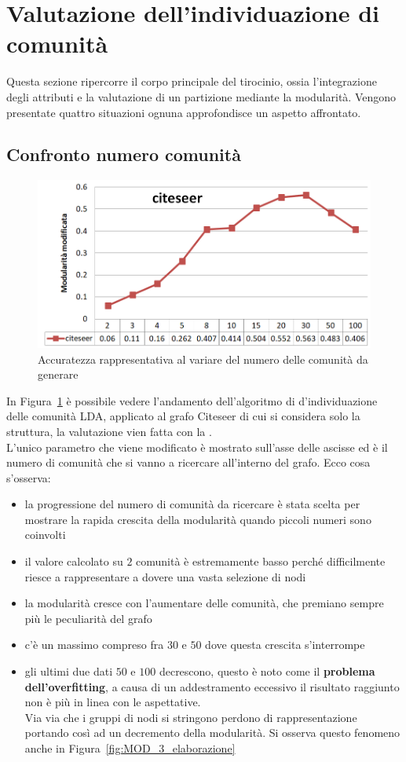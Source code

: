 \section{Valutazione dell'individuazione di comunità}
Questa sezione ripercorre il corpo principale del tirocinio, ossia l'integrazione degli attributi e la valutazione di un partizione mediante la modularità. Vengono presentate quattro situazioni ognuna approfondisce un aspetto affrontato.
%
\subsection{Confronto numero comunità}%
%
\begin{figure}[htp]
	\centering
	\includegraphics[width=\linewidth]{immagini/MOD_1_num_cmty}
	\caption{Accuratezza rappresentativa al variare del numero delle comunità da generare}
	\label{fig:MOD_1_num_cmty}
\end{figure}
%
In Figura~\ref{fig:MOD_1_num_cmty} è possibile vedere l'andamento dell'algoritmo di d'individuazione delle comunità LDA, applicato al grafo Citeseer di cui si considera solo la struttura, la valutazione vien fatta con la \mmod.\\
L'unico parametro che viene modificato è mostrato sull'asse delle ascisse ed è il numero di comunità che si vanno a ricercare all'interno del grafo. Ecco cosa s'osserva:
\begin{itemize}
	\item la progressione del numero di comunità da ricercare è stata scelta per mostrare la rapida crescita della modularità quando piccoli numeri sono coinvolti
	\item il valore calcolato su $2$ comunità è estremamente basso perché difficilmente riesce a rappresentare a dovere una vasta selezione di nodi
	\item la modularità cresce con l'aumentare delle comunità, che premiano sempre più le peculiarità del grafo
	\item c'è un massimo compreso fra $30$ e $50$ dove questa crescita s'interrompe
	\item gli ultimi due dati $50$ e $100$ decrescono, questo è noto come il \textbf{problema dell'overfitting}, a causa di un addestramento eccessivo il risultato raggiunto non è più in linea con le aspettative.\\
	Via via che i gruppi di nodi si stringono perdono di rappresentazione portando così ad un decremento della modularità. Si osserva questo fenomeno anche in Figura~\ref{fig:MOD_3_elaborazione}
\end{itemize}

